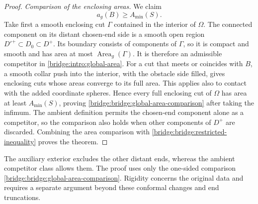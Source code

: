 \begin{proof}
\emph{Comparison of the enclosing areas.} We claim
\begin{equation}
\label{bridge:bridge:global-area-comparison}
                         a_g(B)\ge A_{\min}(S).
\end{equation}
Take first a smooth enclosing cut $\Gamma$ contained in the interior
of $\Omega$. The connected component on its distant chosen-end side is
a smooth open region $D'^+\subset D_0\subset D^+$. Its boundary
consists of components of $\Gamma$, so it is compact and smooth and
has area at most $\operatorname{Area}_g(\Gamma)$. It is therefore an
admissible competitor in \eqref{bridge:intro:global-area}.
For a cut that meets or coincides with $B$, a smooth collar push into
the interior, with the obstacle side filled, gives enclosing cuts
whose areas converge to its full area. This applies also to contact
with the added coordinate spheres. Hence every full enclosing cut
of $\Omega$ has area at least $A_{\min}(S)$, proving
\eqref{bridge:bridge:global-area-comparison} after taking the infimum.
The ambient definition permits the chosen-end component alone as
a competitor, so the comparison also holds when other components of
$D^+$ are discarded. Combining the area comparison with
\eqref{bridge:bridge:restricted-inequality} proves the theorem.
\end{proof}

The auxiliary exterior excludes the other distant ends, whereas the
ambient competitor class allows them. The proof uses only the
one-sided comparison \eqref{bridge:bridge:global-area-comparison}.
Rigidity concerns the original data and requires a separate argument
beyond these conformal changes and end truncations.
